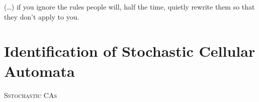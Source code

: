 
\begin{savequote}[99mm]
(\ldots) if you ignore the rules people will, half the time, quietly rewrite them so that they don't apply to you.
\end{savequote}

\chapter{Identification of Stochastic Cellular Automata}\label{chap:identify-sca}

\lettrine[lines=5, loversize=-0.1, lraise=0.1]{S}{stochastic CAs} 
